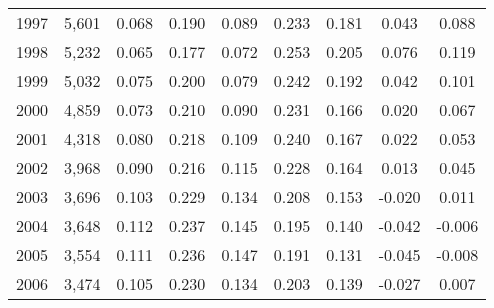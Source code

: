\begin{tabular}{l c c c c c c c c}
1997&5,601&0.068&0.190&0.089&0.233&0.181&0.043&0.088\\
1998&5,232&0.065&0.177&0.072&0.253&0.205&0.076&0.119\\
1999&5,032&0.075&0.200&0.079&0.242&0.192&0.042&0.101\\
2000&4,859&0.073&0.210&0.090&0.231&0.166&0.020&0.067\\
2001&4,318&0.080&0.218&0.109&0.240&0.167&0.022&0.053\\
2002&3,968&0.090&0.216&0.115&0.228&0.164&0.013&0.045\\
2003&3,696&0.103&0.229&0.134&0.208&0.153&-0.020&0.011\\
2004&3,648&0.112&0.237&0.145&0.195&0.140&-0.042&-0.006\\
2005&3,554&0.111&0.236&0.147&0.191&0.131&-0.045&-0.008\\
2006&3,474&0.105&0.230&0.134&0.203&0.139&-0.027&0.007\\
\bottomrule
\end{tabular}
